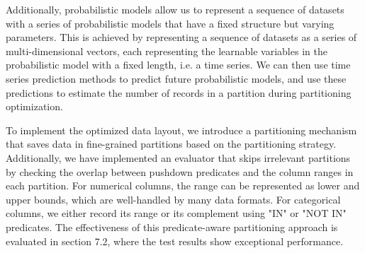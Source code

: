 Additionally, probabilistic models allow us to represent a sequence of datasets with a series of probabilistic models that have a fixed structure but varying parameters. This is achieved by representing a sequence of datasets as a series of multi-dimensional vectors, each representing the learnable variables in the probabilistic model with a fixed length, i.e. a time series. We can then use time series prediction methods to predict future probabilistic models, and use these predictions to estimate the number of records in a partition during partitioning optimization.


To implement the optimized data layout, we introduce a partitioning mechanism that saves data in fine-grained partitions based on the partitioning strategy. Additionally, we have implemented an evaluator that skips irrelevant partitions by checking the overlap between pushdown predicates and the column ranges in each partition. For numerical columns, the range can be represented as lower and upper bounds, which are well-handled by many data formats. For categorical columns, we either record its range or its complement using "IN" or "NOT IN" predicates. The effectiveness of this predicate-aware partitioning approach is evaluated in section 7.2, where the test results show exceptional performance.
